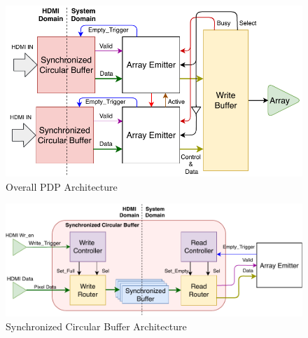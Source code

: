     \begin{figure}%
        \centering
        \includegraphics[width=1.0\textwidth]{fig/pdp_overall_arch.pdf}
        \caption{Overall PDP Architecture}
        \label{fig:overall_arch}
    \end{figure}%
    \begin{figure}%
        \centering
        \includegraphics[width=1.0\textwidth]{fig/pdp_scb_arch.pdf}
        \caption{Synchronized Circular Buffer Architecture}
        \label{fig:scb_arch}
    \end{figure}

